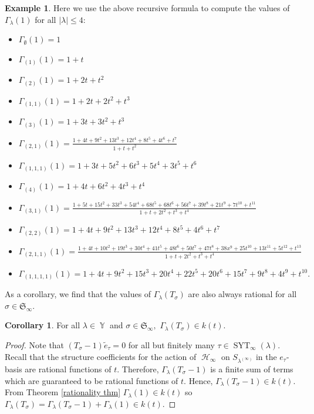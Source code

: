 \documentclass[12pt,reqno]{amsart}
\theoremstyle{definition}
\newtheorem{cor}[thm]{Corollary}
\newtheorem{example}{Example}
\DeclareMathOperator{\cH}{\mathcal{H}}
\DeclareMathOperator{\SYT}{\mathrm{SYT}}
\DeclareMathOperator{\Par}{\mathbb{Y}}
\begin{document}
\begin{example}
    
Here we use the above recursive formula to compute the values of $\Gamma_{\lambda}(1)$ for all $|\lambda|\leq 4:$

\begin{itemize}
    \item $\Gamma_{\emptyset}(1) = 1$
    \item $\Gamma_{(1)}(1) = 1+t$
    \item $\Gamma_{(2)}(1)= 1+2t+t^2$
    \item $\Gamma_{(1,1)}(1)= 1+2t+2t^2+t^3$
    \item $\Gamma_{(3)}(1) = 1 + 3 t + 3 t^2 + t^3$
     \item $\Gamma_{(2,1)}(1) = \frac{1+4t+9t^2+13t^3+12t^4+8t^5+4t^6+t^7}{1+t+t^2}$
    \item $\Gamma_{(1,1,1)}(1)= 1 + 3 t + 5 t^2 + 6 t^3 + 5 t^4 + 3 t^5 + t^6$
    \item $\Gamma_{(4)}(1) = 1 + 4 t + 6 t^2 + 4 t^3 + t^4$
    \item $\Gamma_{(3,1)}(1)= \frac{1 + 5 t + 15 t^2 + 33 t^3 + 54 t^4 + 68 t^5 + 68 t^6 + 56 t^7 + 39 t^8 + 21 t^9 + 7 t^{10} + t^{11}}{1+t+2t^2+t^3+t^4}$
    \item $\Gamma_{(2,2)}(1)= 1+4t+9t^2+13t^3+12t^4+8t^5+4t^6+t^7$
    \item $\Gamma_{(2,1,1)}(1) = \frac{1 + 4 t + 10 t^2 + 19 t^3 + 30 t^4 + 41 t^5 + 48 t^6 + 50 t^7 + 47 t^8 + 38 x^9 + 25 t^{10} + 13 t^{11} + 5 t^{12} + t^{13}}{1+t+2t^2+t^3+t^4}$
    \item $\Gamma_{(1,1,1,1)}(1)= 1 + 4 t + 9 t^2 + 15 t^3 + 20 t^4 + 22 t^5 + 20 t^6 + 15 t^7 + 9 t^8 + 4 t^9 + t^{10}.$
\end{itemize} 
\end{example}

As a corollary, we find that the values of $\Gamma_{\lambda}(T_{\sigma})$ are also always rational for all $\sigma \in \mathfrak{S}_{\infty}.$

\begin{cor}
     For all $\lambda \in \Par$ and $\sigma \in \mathfrak{S}_{\infty},$ $\Gamma_{\lambda}(T_{\sigma}) \in k(t).$ 
\end{cor}
\begin{proof}
    Note that $(T_{\sigma} -1)\tilde{e}_{\tau} = 0$ for all but finitely many $\tau \in \SYT_{\infty}(\lambda).$ Recall that the structure coefficients for the action of $\cH_{\infty}$ on $S_{\lambda^{(\infty)}}$ in the $e_{\tau}$-basis are rational functions of $t.$ Therefore, $\Gamma_{\lambda}(T_{\sigma}-1)$ is a finite sum of terms which are guaranteed to be rational functions of $t.$ Hence, $\Gamma_{\lambda}(T_{\sigma}-1) \in k(t).$ From Theorem \ref{rationality thm} $\Gamma_{\lambda}(1) \in k(t)$ so 
    $\Gamma_{\lambda}(T_{\sigma}) = \Gamma_{\lambda}(T_{\sigma}-1) + \Gamma_{\lambda}(1) \in k(t).$
\end{proof}

\printbibliography
\end{document}
